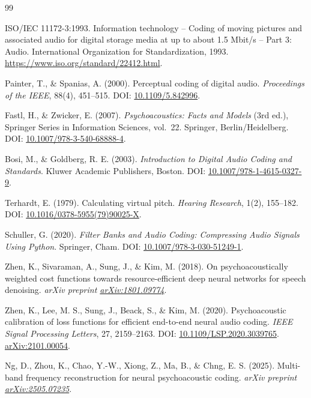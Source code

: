 \documentclass[11pt,a4paper]{article}
\begin{document}
\begin{thebibliography}{99}

ISO/IEC 11172-3:1993.
Information technology -- Coding of moving pictures and associated audio for digital storage media at up to about 1.5 Mbit/s -- Part 3: Audio.
International Organization for Standardization, 1993. \url{https://www.iso.org/standard/22412.html}.

Painter, T., \& Spanias, A. (2000).
Perceptual coding of digital audio.
\textit{Proceedings of the IEEE}, 88(4), 451--515.
DOI: \href{https://doi.org/10.1109/5.842996}{10.1109/5.842996}.

Fastl, H., \& Zwicker, E. (2007).
\textit{Psychoacoustics: Facts and Models} (3rd ed.), Springer Series in Information Sciences, vol.\ 22.
Springer, Berlin/Heidelberg.
DOI: \href{https://doi.org/10.1007/978-3-540-68888-4}{10.1007/978-3-540-68888-4}.

Bosi, M., \& Goldberg, R. E. (2003).
\textit{Introduction to Digital Audio Coding and Standards}.
Kluwer Academic Publishers, Boston.
DOI: \href{https://doi.org/10.1007/978-1-4615-0327-9}{10.1007/978-1-4615-0327-9}.

Terhardt, E. (1979).
Calculating virtual pitch.
\textit{Hearing Research}, 1(2), 155--182.
DOI: \href{https://doi.org/10.1016/0378-5955(79)90025-X}{10.1016/0378-5955(79)90025-X}.

Schuller, G. (2020).
\textit{Filter Banks and Audio Coding: Compressing Audio Signals Using Python}.
Springer, Cham.
DOI: \href{https://doi.org/10.1007/978-3-030-51249-1}{10.1007/978-3-030-51249-1}.

Zhen, K., Sivaraman, A., Sung, J., \& Kim, M. (2018).
On psychoacoustically weighted cost functions towards resource-efficient deep neural networks for speech denoising.
\textit{arXiv preprint \href{https://arxiv.org/abs/1801.09774}{arXiv:1801.09774}}.

Zhen, K., Lee, M. S., Sung, J., Beack, S., \& Kim, M. (2020).
Psychoacoustic calibration of loss functions for efficient end-to-end neural audio coding.
\textit{IEEE Signal Processing Letters}, 27, 2159--2163.
DOI: \href{https://doi.org/10.1109/LSP.2020.3039765}{10.1109/LSP.2020.3039765}. \href{https://arxiv.org/abs/2101.00054}{arXiv:2101.00054}.

Ng, D., Zhou, K., Chao, Y.-W., Xiong, Z., Ma, B., \& Chng, E. S. (2025).
Multi-band frequency reconstruction for neural psychoacoustic coding.
\textit{arXiv preprint \href{https://arxiv.org/abs/2505.07235}{arXiv:2505.07235}}.


\end{thebibliography}
\end{document}

